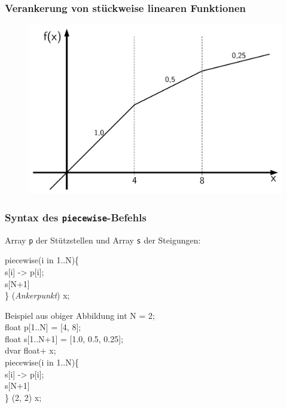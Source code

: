 \begin{frame}
 \frametitle{Verankerung von stückweise linearen Funktionen}
 \begin{figure}
  \centering
  \includegraphics[width=\linewidth,page=2]{Bilder/StueckweiseLineareFunktion3}
 \end{figure}
\end{frame}

\begin{frame}
 \frametitle{Syntax des \texttt{piecewise}-Befehls}
 Array \texttt{p} der Stützstellen und Array \texttt{s} der Steigungen:
 \begin{center}
  \begin{minipage}{.5\linewidth}
   \ttfamily
    piecewise(i in 1..N)\{\\
    \mbox{}\quad s[i] -> p[i];\\
    \mbox{}\quad s[N+1]\\
    \} (\textsf{\slshape Ankerpunkt}) x;\\
  \end{minipage}
 \end{center}
 \vspace{-3ex}
 \begin{block}{Beispiel aus obiger Abbildung}\ttfamily\footnotesize
  int N = 2;\\
  float p[1..N] = [4, 8];\\
  float s[1..N+1] = [1.0, 0.5, 0.25];\\
  dvar float+ x;\\[2ex]  
  piecewise(i in 1..N)\{\\
    \quad s[i] -> p[i];\\
    \quad s[N+1]\\
  \} (2, 2) x;\\
 \end{block}
\end{frame}

